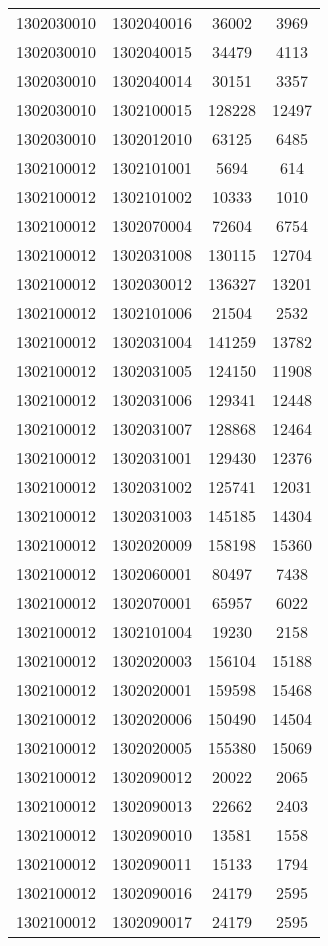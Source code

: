 \begin{longtable}{llcc}
1302030010 & 1302040016 & 36002 & 3969\\
1302030010 & 1302040015 & 34479 & 4113\\
1302030010 & 1302040014 & 30151 & 3357\\
1302030010 & 1302100015 & 128228 & 12497\\
1302030010 & 1302012010 & 63125 & 6485\\
1302100012 & 1302101001 & 5694 & 614\\
1302100012 & 1302101002 & 10333 & 1010\\
1302100012 & 1302070004 & 72604 & 6754\\
1302100012 & 1302031008 & 130115 & 12704\\
1302100012 & 1302030012 & 136327 & 13201\\
1302100012 & 1302101006 & 21504 & 2532\\
1302100012 & 1302031004 & 141259 & 13782\\
1302100012 & 1302031005 & 124150 & 11908\\
1302100012 & 1302031006 & 129341 & 12448\\
1302100012 & 1302031007 & 128868 & 12464\\
1302100012 & 1302031001 & 129430 & 12376\\
1302100012 & 1302031002 & 125741 & 12031\\
1302100012 & 1302031003 & 145185 & 14304\\
1302100012 & 1302020009 & 158198 & 15360\\
1302100012 & 1302060001 & 80497 & 7438\\
1302100012 & 1302070001 & 65957 & 6022\\
1302100012 & 1302101004 & 19230 & 2158\\
1302100012 & 1302020003 & 156104 & 15188\\
1302100012 & 1302020001 & 159598 & 15468\\
1302100012 & 1302020006 & 150490 & 14504\\
1302100012 & 1302020005 & 155380 & 15069\\
1302100012 & 1302090012 & 20022 & 2065\\
1302100012 & 1302090013 & 22662 & 2403\\
1302100012 & 1302090010 & 13581 & 1558\\
1302100012 & 1302090011 & 15133 & 1794\\
1302100012 & 1302090016 & 24179 & 2595\\
1302100012 & 1302090017 & 24179 & 2595\\

\end{longtable}
